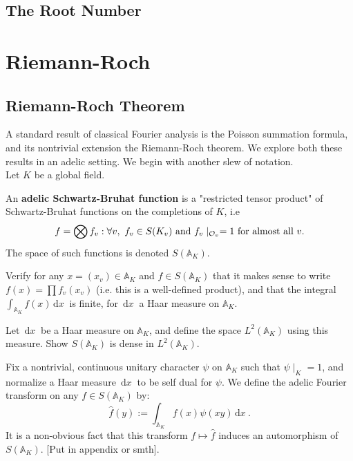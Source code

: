 \documentclass[11pt, x11names]{book}
\renewcommand{\aa}{\mathbb{A}}
\newcommand{\bigtensor}{\bigotimes}
\renewcommand{\hat}{\widehat}
\newcommand{\dx}{\, \mathrm{d}x \ }
\begin{document}
\subsection{The Root Number}
\label{subsection: The Root Number}


\section{Riemann-Roch}
\label{section: Riemann-roch}



\subsection{Riemann-Roch Theorem}
\label{subsection: Riemann-Roch}

A standard result of classical Fourier analysis is the Poisson summation formula, and its nontrivial extension the Riemann-Roch theorem. We explore both these results in an adelic setting. We begin with another slew of notation.\\
Let $K$ be a global field.
\begin{defn}
\label{def: adelic SB-functions}
An \textbf{adelic Schwartz-Bruhat function} is a "restricted tensor product" of Schwartz-Bruhat functions on the completions of $K$, i.e
\begin{equation*}
    f = \bigtensor f_v : \forall v, \ f_v \in S(K_v) \text{ and } f_v\mid_{\calo_v} = 1 \text{ for almost all } v.
\end{equation*}
The space of such functions is denoted $S(\aa_K)$.
\end{defn}
\begin{sanitycheck}
    Verify for any $x = (x_v) \in \aa_K$ and $f \in S(\aa_K)$ that it makes sense to write $f(x) = \prod f_v(x_v)$ (i.e. this is a well-defined product), and that the integral $\int_{\aa_K} f(x) \dx$ is finite, for $\dx$ a Haar measure on $\aa_K$.
\end{sanitycheck}
\begin{exercise}
\label{exercise: S(A_K) dense in L^2(A_K)}
    Let $\dx$ be a Haar measure on $\aa_K$, and define the space $L^2(\aa_K)$ using this measure. Show $S(\aa_K)$ is dense in $L^2(\aa_K)$.
\end{exercise}
Fix a nontrivial, continuous unitary character $\psi$ on $\aa_K$ such that $\psi \mid_K = 1$, and normalize a Haar measure $\dx$ to be self dual for $\psi$. We define the adelic Fourier transform on any $f \in S(\aa_K)$ by:
\begin{equation*}
    \hat{f}(y) := \int_{\aa_K} f(x) \psi(xy) \dx.
\end{equation*}
It is a non-obvious fact that this transform $f \mapsto \hat{f}$ induces an automorphism of $S(\aa_K)$. [Put in appendix or smth].\\
\end{document}
